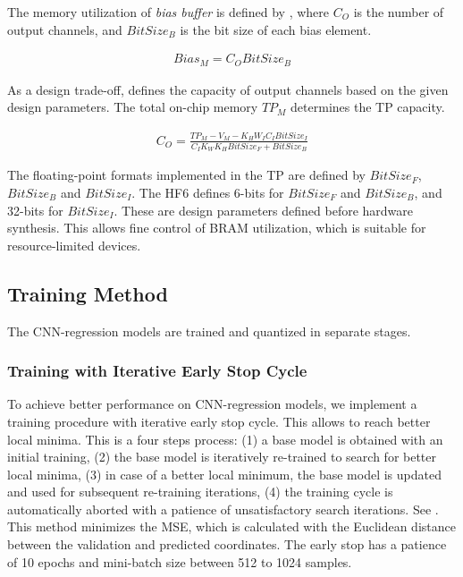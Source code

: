 The memory utilization of \emph{bias buffer} is defined by , where $C_{O}$ is the number of output channels, and $BitSize_{B}$ is the bit size of each bias element.

\begin{eqnarray} \label{eq:bias_memory}
Bias_{M}=C_{O}BitSize_{B}
\end{eqnarray}

As a design trade-off,  defines the capacity of output channels based on the given design parameters. The total on-chip memory $TP_{M}$ determines the TP capacity.

\begin{eqnarray} \label{eq:channel_in_memory}
C_{O}=\frac{TP_{M}-V_{M}-K_{H}W_{I}C_{I}BitSize_{I}}{C_{I}K_{W}K_{H}BitSize_{F}+BitSize_{B}}
\end{eqnarray}

The floating-point formats implemented in the TP are defined by $BitSize_F$, $BitSize_B$ and $BitSize_I$. The HF6 defines 6-bits for $BitSize_F$ and $BitSize_B$, and 32-bits for $BitSize_I$. These are design parameters defined before hardware synthesis. This allows fine control of BRAM utilization, which is suitable for resource-limited devices.

\subsection{Training Method}
The CNN-regression models are trained and quantized in separate stages.
\subsubsection{Training with Iterative Early Stop Cycle}
To achieve better performance on CNN-regression models, we implement a training procedure with iterative early stop cycle. This allows to reach better local minima. This is a four steps process: (1) a base model is obtained with an initial training, (2) the base model is iteratively re-trained to search for better local minima, (3) in case of a better local minimum, the base model is updated and used for subsequent re-training iterations, (4) the training cycle is automatically aborted with a patience of unsatisfactory search iterations. See . This method minimizes the MSE, which is calculated with the Euclidean distance between the validation and predicted coordinates. The early stop has a patience of 10 epochs and mini-batch size between 512 to 1024 samples.

